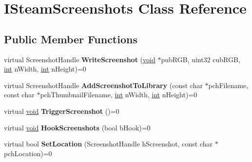 \hypertarget{classISteamScreenshots}{}\section{I\+Steam\+Screenshots Class Reference}
\label{classISteamScreenshots}
\subsection*{Public Member Functions}
\begin{DoxyCompactItemize}
\item 
\hypertarget{classISteamScreenshots_ad3069b419720346b2eacb014ceae8b3d}{}virtual Screenshot\+Handle {\bfseries Write\+Screenshot} (\hyperlink{SDL__audio_8h_a52835ae37c4bb905b903cbaf5d04b05f}{void} $\ast$pub\+R\+G\+B, uint32 cub\+R\+G\+B, \hyperlink{SDL__thread_8h_a6a64f9be4433e4de6e2f2f548cf3c08e}{int} n\+Width, \hyperlink{SDL__thread_8h_a6a64f9be4433e4de6e2f2f548cf3c08e}{int} n\+Height)=0\label{classISteamScreenshots_ad3069b419720346b2eacb014ceae8b3d}

\item 
\hypertarget{classISteamScreenshots_acadf781133faca81c54d5f5c9cc4982d}{}virtual Screenshot\+Handle {\bfseries Add\+Screenshot\+To\+Library} (const char $\ast$pch\+Filename, const char $\ast$pch\+Thumbnail\+Filename, \hyperlink{SDL__thread_8h_a6a64f9be4433e4de6e2f2f548cf3c08e}{int} n\+Width, \hyperlink{SDL__thread_8h_a6a64f9be4433e4de6e2f2f548cf3c08e}{int} n\+Height)=0\label{classISteamScreenshots_acadf781133faca81c54d5f5c9cc4982d}

\item 
\hypertarget{classISteamScreenshots_ae88ff88cf567652fea007c1caaeac5ce}{}virtual \hyperlink{SDL__audio_8h_a52835ae37c4bb905b903cbaf5d04b05f}{void} {\bfseries Trigger\+Screenshot} ()=0\label{classISteamScreenshots_ae88ff88cf567652fea007c1caaeac5ce}

\item 
\hypertarget{classISteamScreenshots_a41cf1b85b6403fd72368422e1b4396b8}{}virtual \hyperlink{SDL__audio_8h_a52835ae37c4bb905b903cbaf5d04b05f}{void} {\bfseries Hook\+Screenshots} (bool b\+Hook)=0\label{classISteamScreenshots_a41cf1b85b6403fd72368422e1b4396b8}

\item 
\hypertarget{classISteamScreenshots_a4d2f4979b52fbf1eded70b117415ebb5}{}virtual bool {\bfseries Set\+Location} (Screenshot\+Handle h\+Screenshot, const char $\ast$pch\+Location)=0\label{classISteamScreenshots_a4d2f4979b52fbf1eded70b117415ebb5}


\end{DoxyCompactItemize}
